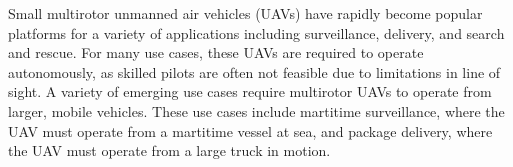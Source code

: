 
Small multirotor unmanned air vehicles (UAVs) have rapidly become popular platforms for
a variety of applications including
surveillance, delivery, and search and rescue.
For many use cases, these UAVs are required to operate
autonomously, as skilled pilots are often not feasible due to
limitations in line of sight. 
A variety of emerging use cases
require multirotor UAVs to operate from larger, mobile vehicles.
These use
cases include martitime surveillance, where the UAV must operate from
a martitime vessel at sea,
and package delivery, where the UAV must operate from a large truck in motion.



